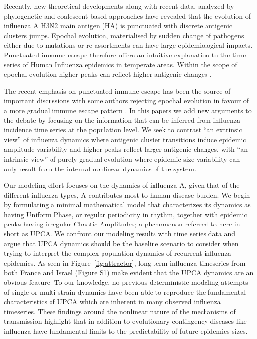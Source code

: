 \documentclass[12pt]{article}
\begin{document}
Recently, new theoretical developments along with recent data,
analyzed by phylogenetic and coalescent based approaches
\citep{Smith2004, Koelle2006, Wolf2006, Rambaut2008} have revealed
that the evolution of influenza A H3N2 main antigen (HA) is punctuated
with discrete antigenic clusters jumps. Epochal evolution,
materialised by sudden change of pathogens either due to mutations or
re-assortments can have large epidemiological impacts. Punctuated
immune escape therefore offers an intuitive explanation to the time
series of Human Influenza epidemics in temperate areas. Within the
scope of epochal evolution higher peaks can reflect higher antigenic
changes \citep{Koelle2006}.

The recent emphasis on punctuated immune escape has been the source of
important discussions with some authors rejecting epochal evolution in
favour of a more gradual immune escape pattern \citet{Shih2007,
  Suzuki2008}. In this papers we add new arguments to the debate by
focusing on the information that can be inferred from influenza
incidence time series at the population level.  We seek to contrast
``an extrinsic view'' \citep{Cobey2008} of influenza dynamics where
antigenic cluster transitions induce epidemic amplitude variability
and higher peaks reflect larger antigenic changes, with ``an intrinsic
view'' of purely gradual evolution where epidemic size variability can
only result from the internal nonlinear dynamics of the system.

Our modeling effort focuses on the dynamics of influenza A, given that
of the different influenza types, A contributes most to human disease
burden.  We begin by formulating a minimal mathematical model that
characterizes its dynamics as having Uniform Phase, or regular
periodicity in rhythm, together with epidemic peaks having irregular
Chaotic Amplitudes; a phenomenon referred to here in short as UPCA.
We confront our modeling results with time series data and argue that
UPCA dynamics should be the baseline scenario to consider when trying
to interpret the complex population dynamics of recurrent influenza
epidemics.  As seen in Figure~\ref{fig:attractor}, long-term influenza
timeseries from both France and Israel (Figure S1) make evident that
the UPCA dynamics are an obvious feature.  To our knowledge, no
previous deterministic modeling attempts of single or multi-strain
dynamics have been able to reproduce the fundamental characteristics
of UPCA which are inherent in many observed influenza timeseries.
These findings around the nonlinear nature of the mechanisms of
transmission highlight that in addition to evolutionary contingency
diseases like influenza have fundamental limits to the predictability
of future epidemics sizes.
\end{document}
